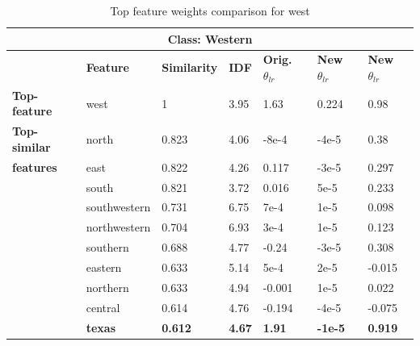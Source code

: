 \begin{table}[htbp]
\centering
\begin{tabular}{lllllll}
\multicolumn{7}{c}{\textbf{Class: Western}} \\ \hline
\multicolumn{1}{l|}{\textbf{}} & \multicolumn{1}{l|}{\textbf{Feature}} & \multicolumn{1}{l|}{\textbf{Similarity}} & \multicolumn{1}{l|}{\textbf{IDF}} & \multicolumn{1}{l|}{\textbf{Orig. $\theta_{lr}$}} & \multicolumn{1}{l|}{\textbf{New $\theta_{lr}$}} & \textbf{New $\theta_{lr}$} \\ \hline
\multicolumn{1}{l|}{\textbf{Top-feature}} & \multicolumn{1}{l|}{west} & \multicolumn{1}{l|}{1} & \multicolumn{1}{l|}{3.95} & \multicolumn{1}{l|}{1.63} & \multicolumn{1}{l|}{0.224} & 0.98 \\ \hline
\multicolumn{1}{l|}{\textbf{Top-similar}} & \multicolumn{1}{l|}{north} & \multicolumn{1}{l|}{0.823} & \multicolumn{1}{l|}{4.06} & \multicolumn{1}{l|}{-8e-4} & \multicolumn{1}{l|}{-4e-5} & 0.38 \\
\multicolumn{1}{l|}{\textbf{features}} & \multicolumn{1}{l|}{east} & \multicolumn{1}{l|}{0.822} & \multicolumn{1}{l|}{4.26} & \multicolumn{1}{l|}{0.117} & \multicolumn{1}{l|}{-3e-5} & 0.297 \\
\multicolumn{1}{l|}{} & \multicolumn{1}{l|}{south} & \multicolumn{1}{l|}{0.821} & \multicolumn{1}{l|}{3.72} & \multicolumn{1}{l|}{0.016} & \multicolumn{1}{l|}{5e-5} & 0.233 \\
\multicolumn{1}{l|}{\textbf{}} & \multicolumn{1}{l|}{southwestern} & \multicolumn{1}{l|}{0.731} & \multicolumn{1}{l|}{6.75} & \multicolumn{1}{l|}{7e-4} & \multicolumn{1}{l|}{1e-5} & 0.098 \\
\multicolumn{1}{l|}{} & \multicolumn{1}{l|}{northwestern} & \multicolumn{1}{l|}{0.704} & \multicolumn{1}{l|}{6.93} & \multicolumn{1}{l|}{3e-4} & \multicolumn{1}{l|}{1e-5} & 0.123 \\
\multicolumn{1}{l|}{} & \multicolumn{1}{l|}{southern} & \multicolumn{1}{l|}{0.688} & \multicolumn{1}{l|}{4.77} & \multicolumn{1}{l|}{-0.24} & \multicolumn{1}{l|}{-3e-5} & 0.308 \\
\multicolumn{1}{l|}{\textbf{}} & \multicolumn{1}{l|}{eastern} & \multicolumn{1}{l|}{0.633} & \multicolumn{1}{l|}{5.14} & \multicolumn{1}{l|}{5e-4} & \multicolumn{1}{l|}{2e-5} & -0.015 \\
\multicolumn{1}{l|}{} & \multicolumn{1}{l|}{northern} & \multicolumn{1}{l|}{0.633} & \multicolumn{1}{l|}{4.94} & \multicolumn{1}{l|}{-0.001} & \multicolumn{1}{l|}{1e-5} & 0.022 \\
\multicolumn{1}{l|}{} & \multicolumn{1}{l|}{central} & \multicolumn{1}{l|}{0.614} & \multicolumn{1}{l|}{4.76} & \multicolumn{1}{l|}{-0.194} & \multicolumn{1}{l|}{-4e-5} & -0.075 \\
\multicolumn{1}{l|}{\textbf{}} & \multicolumn{1}{l|}{\textbf{texas}} & \multicolumn{1}{l|}{\textbf{0.612}} & \multicolumn{1}{l|}{\textbf{4.67}} & \multicolumn{1}{l|}{\textbf{1.91}} & \multicolumn{1}{l|}{\textbf{-1e-5}} & \textbf{0.919}
\end{tabular}
\caption{\label{tab:widgets}Top feature weights comparison for west}
\end{table}

